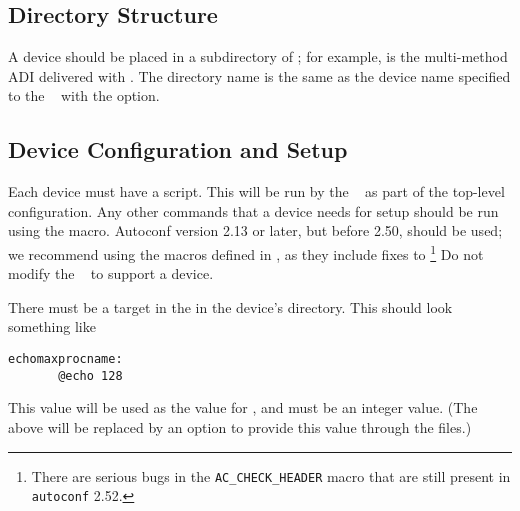 \subsection{Directory Structure}
\label{sec:adi3-dirs}
A device should be placed in a subdirectory of ;
for example,  is the multi-method ADI
delivered with \mpich.  The directory name is the same as the device
name specified to the \mpich\  with the
 option.

\subsection{Device Configuration and Setup}
\label{sec:adi3-setup}
Each device must have a  script.  This will be run by
the \mpich\  as part of the top-level configuration.
Any other commands that a device needs for setup should be run using
the   macro.  Autoconf version
2.13 or later, but before 2.50, should be used; we recommend using the
macros defined in 
, as they include fixes to
\footnote{There are serious bugs in the
\texttt{AC_CHECK_HEADER} macro that are still present in
\texttt{autoconf} 2.52.}
Do not modify the \mpich\  to support a device.

There must be a  target in the 
in the device's directory.  This should look something like
\begin{verbatim}
echomaxprocname:
       @echo 128
\end{verbatim}
This value will be used as the value for
, and must be an integer value.
(The above will be replaced by an option to provide this value through
the  files.)
